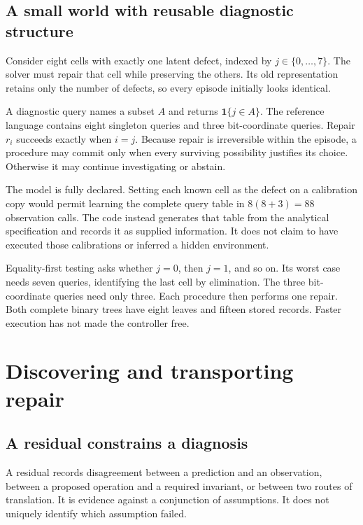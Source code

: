 \section{A small world with reusable diagnostic structure}\label{SII:sec:world}
Consider eight cells with exactly one latent defect, indexed by $j\in\{0,\ldots,7\}$. The solver must repair that cell while preserving the others. Its old representation retains only the number of defects, so every episode initially looks identical.

A diagnostic query names a subset $A$ and returns $\mathbf 1\{j\in A\}$. The reference language contains eight singleton queries and three bit-coordinate queries. Repair $r_i$ succeeds exactly when $i=j$. Because repair is irreversible within the episode, a procedure may commit only when every surviving possibility justifies its choice. Otherwise it may continue investigating or abstain.

The model is fully declared. Setting each known cell as the defect on a calibration copy would permit learning the complete query table in $8(8+3)=88$ observation calls. The code instead generates that table from the analytical specification and records it as supplied information. It does not claim to have executed those calibrations or inferred a hidden environment.

Equality-first testing asks whether $j=0$, then $j=1$, and so on. Its worst case needs seven queries, identifying the last cell by elimination. The three bit-coordinate queries need only three. Each procedure then performs one repair. Both complete binary trees have eight leaves and fifteen stored records. Faster execution has not made the controller free.



\chapter{Discovering and transporting repair}\label{SII:book:chapter-60}

\section{A residual constrains a diagnosis}\label{SII:sec:diagnosis}
A residual records disagreement between a prediction and an observation, between a proposed operation and a required invariant, or between two routes of translation. It is evidence against a conjunction of assumptions. It does not uniquely identify which assumption failed.

